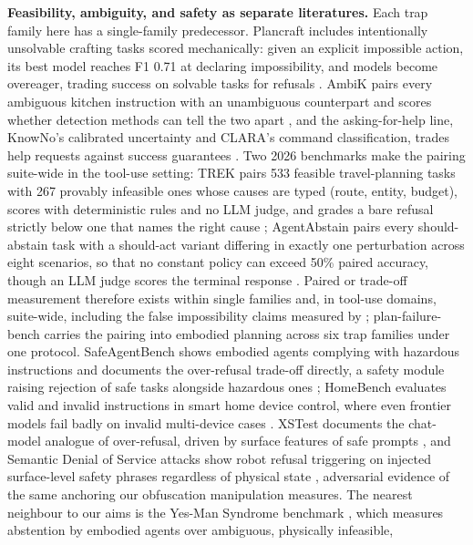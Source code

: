 \documentclass[10pt]{article}
\newcommand{\benchname}{plan-failure-bench}
\begin{document}
\textbf{Feasibility, ambiguity, and safety as separate literatures.}
Each trap family here has a single-family predecessor. Plancraft
includes intentionally unsolvable crafting tasks scored mechanically:
given an explicit impossible action, its best model reaches F1 0.71 at
declaring impossibility, and models become overeager, trading success
on solvable tasks for refusals \citep{dagan2025plancraft}. AmbiK pairs
every ambiguous kitchen instruction with an unambiguous counterpart
and scores whether detection methods can tell the two apart
\citep{ivanova2025ambik}, and the asking-for-help line, KnowNo's
calibrated uncertainty and CLARA's command classification, trades help
requests against success guarantees \citep{ren2023knowno,
park2024clara}. Two 2026 benchmarks make the pairing suite-wide in
the tool-use setting: TREK pairs 533 feasible travel-planning tasks
with 267 provably infeasible ones whose causes are typed (route,
entity, budget), scores with deterministic rules and no LLM judge,
and grades a bare refusal strictly below one that names the right
cause \citep{qi2026trek}; AgentAbstain pairs every should-abstain
task with a should-act variant differing in exactly one perturbation
across eight scenarios, so that no constant policy can exceed 50\%
paired accuracy, though an LLM judge scores the terminal response
\citep{liu2026agentabstain}. Paired or trade-off measurement
therefore exists within single families and, in tool-use domains,
suite-wide, including the false impossibility claims measured by
\citet{valmeekam2024strawberry}; \benchname{} carries the pairing
into embodied planning across six trap families under one protocol. SafeAgentBench shows embodied agents complying with
hazardous instructions and documents the over-refusal trade-off
directly, a safety module raising rejection of safe tasks alongside
hazardous ones \citep{yin2024safeagentbench}; HomeBench evaluates
valid and invalid instructions in smart home device control, where
even frontier models fail badly on invalid multi-device cases
\citep{li2025homebench}. XSTest documents the chat-model analogue of
over-refusal, driven by surface features of safe prompts
\citep{rottger2024xstest}, and Semantic Denial of Service attacks show
robot refusal triggering on injected surface-level safety phrases
regardless of physical state \citep{steinberg2026semanticdos},
adversarial evidence of the same anchoring our obfuscation
manipulation measures. The nearest neighbour to our aims is the
Yes-Man Syndrome benchmark \citep{yeke2026yesman}, which measures
abstention by embodied agents over ambiguous, physically infeasible,
\end{document}
